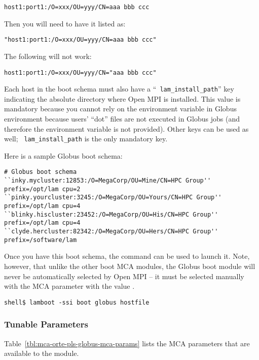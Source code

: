 \centerline{\tt host1:port1:/O=xxx/OU=yyy/CN=aaa bbb ccc}

Then you will need to have it listed as:
    
\centerline{\tt "host1:port1:/O=xxx/OU=yyy/CN=aaa bbb ccc"}

The following will not work:
  
\centerline{\tt host1:port1:/O=xxx/OU=yyy/CN="aaa bbb ccc"}
  
Each host in the boot schema must also have a ``{\tt
  lam\_\-install\_\-path}'' key indicating the absolute directory
where Open MPI is installed.  This value is mandatory because you
cannot rely on the  environment variable in Globus
environment because users' ``dot'' files are not executed in Globus
jobs (and therefore the  environment variable is not
provided).  Other keys can be used as well; {\tt
  lam\_\-install\_\-path} is the only mandatory key.

Here is a sample Globus boot schema:

\lstset{style=lam-shell}
\begin{lstlisting}
# Globus boot schema
``inky.mycluster:12853:/O=MegaCorp/OU=Mine/CN=HPC Group'' prefix=/opt/lam cpu=2
``pinky.yourcluster:3245:/O=MegaCorp/OU=Yours/CN=HPC Group'' prefix=/opt/lam cpu=4
``blinky.hiscluster:23452:/O=MegaCorp/OU=His/CN=HPC Group'' prefix=/opt/lam cpu=4
``clyde.hercluster:82342:/O=MegaCorp/OU=Hers/CN=HPC Group'' prefix=/software/lam
\end{lstlisting}

Once you have this boot schema, the  command can be used
to launch it.  Note, however, that unlike the other boot MCA modules,
the Globus boot module will never be automatically selected by Open MPI --
it must be selected manually with the  MCA parameter
with the value .

\lstset{style=lam-cmdline}
\begin{lstlisting}
shell$ lamboot -ssi boot globus hostfile
\end{lstlisting}


\subsubsection{Tunable Parameters}

Table~\ref{tbl:mca-orte-pls-globus-mca-params} lists the MCA
parameters that are available to the  module.


